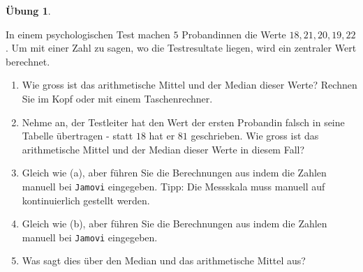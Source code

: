 \documentclass[
]{book}
\providecommand{\tightlist}{%
  \setlength{\itemsep}{0pt}\setlength{\parskip}{0pt}}
\theoremstyle{definition}
\theoremstyle{definition}
\theoremstyle{definition}
\newtheorem{exercise}{Übung}[chapter]
\theoremstyle{definition}
\theoremstyle{remark}
\begin{document}
\begin{exercise}
\protect\hypertarget{exr:theorie-mdn-mean}{}\label{exr:theorie-mdn-mean}\leavevmode

In einem psychologischen Test machen \(5\) Probandinnen die Werte \(18, 21, 20, 19, 22\). Um mit einer Zahl zu sagen, wo die Testresultate liegen, wird ein zentraler Wert berechnet.

\begin{enumerate}
\def\labelenumi{(\alph{enumi})}
\tightlist
\item
  Wie gross ist das arithmetische Mittel und der Median dieser Werte? Rechnen Sie im Kopf oder mit einem Taschenrechner.
\item
  Nehme an, der Testleiter hat den Wert der ersten Probandin falsch in seine Tabelle übertragen - statt \(18\) hat er \(81\) geschrieben. Wie gross ist das arithmetische Mittel und der Median dieser Werte in diesem Fall?
\item
  Gleich wie (a), aber führen Sie die Berechnungen aus indem die Zahlen manuell bei \texttt{Jamovi} eingegeben. Tipp: Die Messskala muss manuell auf kontinuierlich gestellt werden.
\item
  Gleich wie (b), aber führen Sie die Berechnungen aus indem die Zahlen manuell bei \texttt{Jamovi} eingegeben.
\item
  Was sagt dies über den Median und das arithmetische Mittel aus?
\end{enumerate}

\end{exercise}
\end{document}
